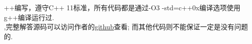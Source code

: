 
\begin{flushleft}
++编写，遵守C++ 11标准，所有代码都是通过-O3 -std=c++0x编译选项使用g++编译运行过. \\
,完整解答源码可以访问作者的\href{https://github.com/sosohu/leetcode}{github}查看; 而其他代码则不能保证一定是没有问题的.
\end{flushleft}
